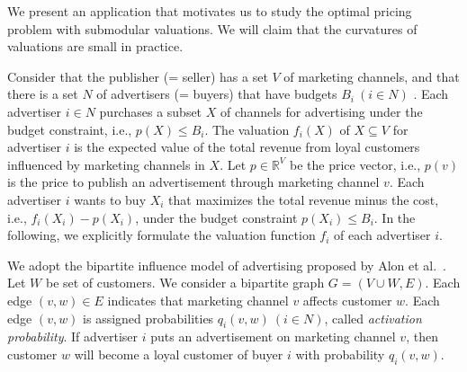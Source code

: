 \documentclass[letterpaper]{article}
\theoremstyle{definition}
\begin{document}
We present an application that motivates us to study the optimal pricing problem with submodular valuations. 
We will claim that the curvatures of valuations are small in practice. 



Consider that the publisher (= seller) has a set $V$ of marketing channels, and that there is a set $N$ of advertisers (= buyers) that have budgets $B_i \ (i \in N)$ . 
Each advertiser $i \in N$ purchases a subset $X$ of channels for advertising under the budget constraint, i.e., $p(X) \leq B_i$. 
The valuation $f_i(X)$ of $X \subseteq V$ for advertiser $i$ is the expected value of the total revenue from loyal customers influenced by marketing channels in $X$. 
Let $p \in \mathbb{R}^V$ be the price vector, i.e., $p(v)$ is the price to publish an advertisement through marketing channel $v$. 
Each advertiser $i$ wants to buy $X_i$ that maximizes the total revenue minus the cost, i.e., $f_i(X_i) - p(X_i)$, under the budget constraint $p(X_i) \leq B_i$. 
In the following, we explicitly formulate the valuation function $f_i$ of each advertiser $i$. 

We adopt the bipartite influence model of advertising proposed by Alon et al.~\cite{alon2012optimizing}. 
Let $W$ be set of customers.
We consider a bipartite graph $G = (V \cup W, E)$. Each edge $(v, w) \in E$ indicates that marketing channel $v$ affects customer $w$.
Each edge $(v,w)$ is assigned probabilities $q_i(v,w) \ (i \in N)$, called \emph{activation probability}. 
If advertiser $i$ puts an advertisement on marketing channel $v$, then customer $w$ will become a loyal customer of buyer $i$ with probability $q_i(v,w)$. 
\end{document}
